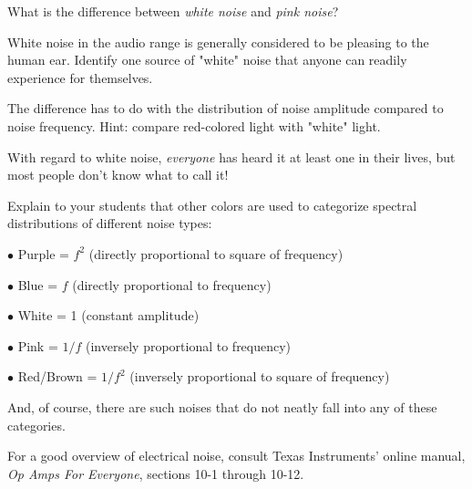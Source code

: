 

What is the difference between {\it white noise} and {\it pink noise}?

\vskip 10pt

White noise in the audio range is generally considered to be pleasing to the human ear.  Identify one source of "white" noise that anyone can readily experience for themselves.







The difference has to do with the distribution of noise amplitude compared to noise frequency.  Hint: compare red-colored light with "white" light.

\vskip 10pt

With regard to white noise, {\it everyone} has heard it at least one in their lives, but most people don't know what to call it!







Explain to your students that other colors are used to categorize spectral distributions of different noise types:

\medskip
\item{$\bullet$} Purple = $f^2$ (directly proportional to square of frequency)
\item{$\bullet$} Blue = $f$ (directly proportional to frequency)
\item{$\bullet$} White = 1 (constant amplitude)
\item{$\bullet$} Pink = $1/f$ (inversely proportional to frequency)
\item{$\bullet$} Red/Brown = $1/{f^2}$ (inversely proportional to square of frequency)
\medskip

And, of course, there are such noises that do not neatly fall into any of these categories.

For a good overview of electrical noise, consult Texas Instruments' online manual, {\it Op Amps For Everyone}, sections 10-1 through 10-12.




